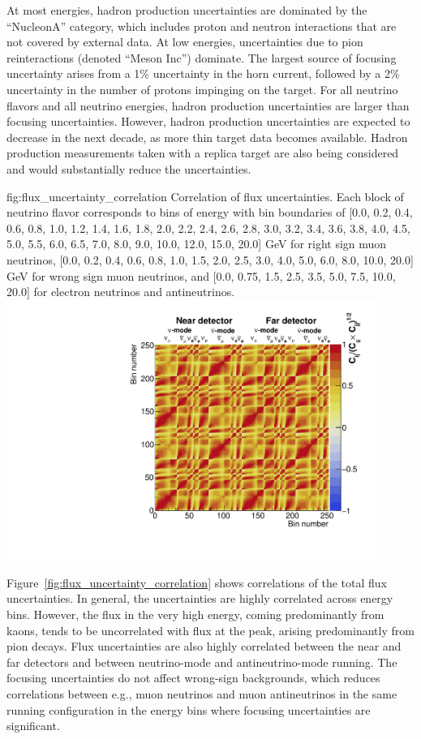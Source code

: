 At most energies, hadron production uncertainties are dominated by the ``NucleonA'' category, which includes proton and neutron interactions that are not covered by external data.  At low energies, uncertainties due to pion reinteractions (denoted ``Meson Inc'') dominate.   The largest source of focusing uncertainty arises from a 1\% uncertainty in the horn current, followed by a 2\% %
uncertainty in the number of protons impinging on the target.   For all neutrino flavors and all neutrino energies, hadron production uncertainties are larger than focusing uncertainties.  However, hadron production uncertainties are expected to decrease in the next decade, as more thin target data becomes available.  Hadron production measurements taken with a replica target are also being considered and would substantially reduce the uncertainties.  

\begin{dunefigure}{fig:flux_uncertainty_correlation}
{Correlation of flux uncertainties.  Each block of neutrino flavor corresponds to bins of energy with bin boundaries of
[0.0, 0.2, 0.4, 0.6, 0.8, 1.0, 1.2, 1.4, 1.6, 1.8, 2.0, 2.2, 2.4, 2.6, 2.8, 3.0, 3.2, 3.4, 3.6, 3.8, 4.0, 4.5, 5.0, 5.5, 6.0, 6.5, 7.0, 8.0, 9.0, 10.0, 12.0, 15.0, 20.0] GeV for right sign muon neutrinos, [0.0, 0.2, 0.4, 0.6, 0.8, 1.0, 1.5, 2.0, 2.5, 3.0, 4.0, 5.0, 6.0, 8.0, 10.0, 20.0] GeV for wrong sign muon neutrinos, and [0.0, 0.75, 1.5, 2.5, 3.5, 5.0, 7.5, 10.0, 20.0] for electron neutrinos and antineutrinos. }
    \includegraphics[width=0.9\textwidth]{graphics/FluxOnAxisCorrMatrix.pdf}
\end{dunefigure}

Figure~\ref{fig:flux_uncertainty_correlation} shows correlations of the total flux uncertainties.  In general, the uncertainties are highly correlated across energy bins. However, the flux in the very high energy, coming predominantly from kaons, tends to be uncorrelated with flux at the peak, %
arising predominantly from pion decays.  Flux uncertainties are also highly correlated between the near and far detectors and between neutrino-mode and antineutrino-mode running.  The focusing uncertainties do not affect wrong-sign backgrounds, which reduces correlations between e.g., muon neutrinos and muon antineutrinos in the same running configuration in the energy bins where focusing uncertainties are significant.    

